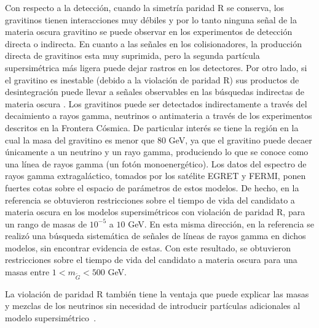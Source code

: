 Con respecto a la detección, cuando la simetría paridad R se conserva,
los gravitinos tienen interacciones muy débiles y por lo tanto ninguna
señal de la materia oscura gravitino se puede observar en los
experimentos de detección directa o indirecta. En cuanto a las señales
en los colisionadores, la producción directa de gravitinos esta muy
suprimida, pero la segunda partícula supersimétrica más ligera puede
dejar rastros en los detectores. Por otro lado, si el gravitino es
inestable (debido a la violación de paridad R) sus productos de
desintegración puede llevar a señales observables en las búsquedas
indirectas de materia oscura
\cite{Bertone:2007aw,Ibarra:2007wg,Covi:2008jy,Ibarra:2008qg}. Los
gravitinos puede ser detectados indirectamente a través del
decaimiento a rayos gamma, neutrinos o antimateria a través de los
experimentos descritos en la Frontera Cósmica. De particular
interés se tiene la región en la cual la masa del gravitino es menor
que $80$ GeV, ya que el gravitino puede decaer únicamente a un neutrino
y un rayo gamma, produciendo lo que se conoce como una línea de rayos
gamma (un fotón monoenergético). Los datos del espectro de rayos gamma
extragaláctico, tomados por los satélite EGRET y FERMI, ponen fuertes
cotas sobre el espacio de parámetros de estos modelos. De hecho, en la
referencia \cite{Yuksel:2007dr} se obtuvieron restricciones sobre el
tiempo de vida del candidato a materia oscura en los modelos
supersimétricos con violación de paridad R, para un rango de masas de
$10^{-5}$ a $10$ GeV. En esta misma dirección, en la referencia
\cite{Vertongen:2011mu} se realizó una búsqueda sistemática de señales
de líneas de rayos gamma en dichos modelos, sin encontrar evidencia de
estas. Con este resultado, se obtuvieron restricciones sobre el tiempo
de vida del candidato a materia oscura para una masas entre
$1<m_{\tilde G}< 500$ GeV.

La violación de paridad R también tiene la ventaja que puede explicar
las masas y mezclas de los neutrinos sin necesidad de introducir
partículas adicionales al modelo supersimétrico~\cite{}. 

